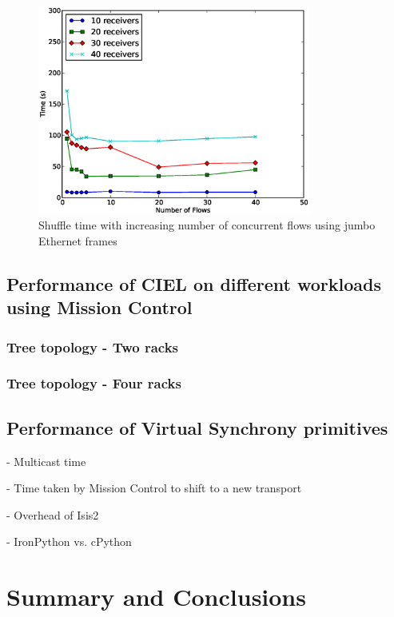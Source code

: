 \documentclass[a4paper,12pt,twoside,openright]{report}
\begin{document}
\begin{figure}[h!]
  \centering
    \includegraphics[width=0.8\textwidth]{shuffle_flows_jumbo.eps}
    \caption{Shuffle time with increasing number of concurrent flows using
    jumbo Ethernet frames}
    \label{chap:eval:sec:ciel:fig:shuffleflowsjumbo}
\end{figure}

\section{Performance of CIEL on different workloads using Mission Control}

\subsection{Tree topology - Two racks}
\subsection{Tree topology - Four racks}

\section{Performance of Virtual Synchrony primitives}
- Multicast time

- Time taken by Mission Control to shift to a new transport

- Overhead of Isis2

- IronPython vs. cPython

\chapter{Summary and Conclusions}\label{chapter:conclusion}
\end{document}
